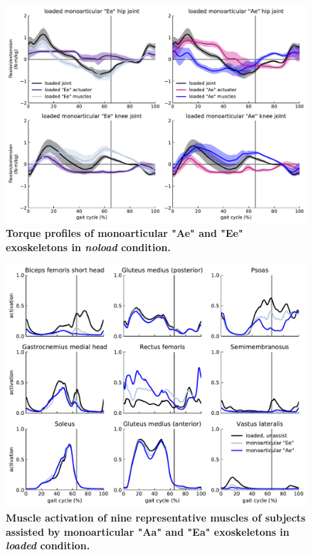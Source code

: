 \documentclass[10pt,letterpaper]{article}
\begin{document}
\begin{figure}[ht]   
	\centering
	\includegraphics[width=\linewidth]{Case_Studies/LoadedMono05_LoadedMono25/PaperFigure_TorqueProfiles.pdf}
	\vspace{1mm}
	\caption{\small{\textbf{Torque profiles of monoarticular "Ae" and "Ee" exoskeletons in {\it noload} condition.}}}
	\label{Fig_TorqueProfiles_Monoarticular}
\end{figure}
\begin{figure}[ht]   
	\centering
	\includegraphics[width=\linewidth]{Case_Studies/LoadedMono05_LoadedMono25/Monoarticular_Ae_VS_Ee_Loaded_MusclesActivation.pdf}
	\vspace{1mm}
	\caption{\small{\textbf{Muscle activation of nine representative muscles of subjects assisted by monoarticular "Aa" and "Ea" exoskeletons in {\it loaded} condition.  }}}
	\label{Fig_MuscleActivation_Monoarticular}
\end{figure}
\end{document}

